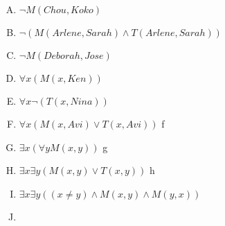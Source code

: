 {{        %
        \begin{practices}
            \begin{enumerate}[A.]
                \item $\neg M(Chou, Koko)$
                \item $\neg (M(Arlene, Sarah) \wedge T(Arlene, Sarah))$
                \item $\neg M(Deborah, Jose)$
                \item $\forall x (M(x, Ken))$
                \item $\forall x \neg (T(x, Nina))$
                \item $\forall x (M(x, Avi) \vee T(x, Avi))$ f
                \item $\exists x (\forall y M(x, y))$ g
                \item $\exists x \exists y (M(x, y) \vee T(x, y))$ h
                \item $\exists x \exists y ((x \neq y) \wedge M(x, y) \wedge M(y, x))$
                \item 
            \end{enumerate}
        \end{practices}
    }
}
